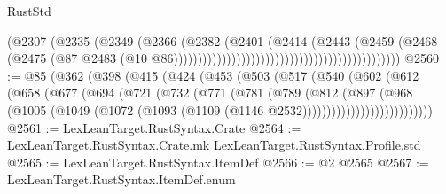 \begin{lexlean}{RustStd}
\begin{coremodule}
{\begin{coremodule}
{{{{{{{{{{{{{{{{{{{{{{{{{{{{{{{{{{{{{{{{{{{{{{{{{{{{{{{{{{{{{{{{{{{{{{{{{{{{{{                                                                        (@2307
                                                                          (@2335
                                                                            (@2349
                                                                              (@2366
                                                                                (@2382
                                                                                  (@2401
                                                                                    (@2414
                                                                                      (@2443
                                                                                        (@2459
                                                                                          (@2468
                                                                                            (@2475
                                                                                              (@87
                                                                                                @2483
                                                                                                (@10
                                                                                                  @86)))))))))))))))))))))))))))))))))))))))))))))))
@2560 := @85
    (@362
      (@398
        (@415
          (@424
            (@453
              (@503
                (@517
                  (@540
                    (@602
                      (@612
                        (@658
                          (@677
                            (@694
                              (@721
                                (@732
                                  (@771
                                    (@781
                                      (@789
                                        (@812
                                          (@897
                                            (@968
                                              (@1005
                                                (@1049
                                                  (@1072
                                                    (@1093
                                                      (@1109 (@1146 @2532)))))))))))))))))))))))))))
@2561 := LexLeanTarget.RustSyntax.Crate
@2564 := LexLeanTarget.RustSyntax.Crate.mk LexLeanTarget.RustSyntax.Profile.std
@2565 := LexLeanTarget.RustSyntax.ItemDef
@2566 := @2 @2565
@2567 := LexLeanTarget.RustSyntax.ItemDef.enum
}}}}}}}}}}}}}}}}}}}}}}}}}}}}}}}}}}}}}}}}}}}}}}}}}}}}}}}}}}}}}}}}}}}}}}}}}}}}}}
\end{coremodule}}
\end{coremodule}
\end{lexlean}
